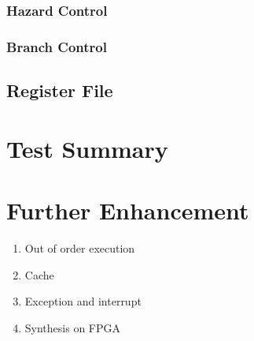 \documentclass[paper=a4, fontsize=11pt]{scrartcl} %
\numberwithin{equation}{section} %
\numberwithin{figure}{section} %
\numberwithin{table}{section} %
\begin{document}
\begin{spacing}{1.5}
    	\subsubsection{Hazard Control}
    	\subsubsection{Branch Control}
    \subsection{Register File}
\section{Test Summary}
\section{Further Enhancement}
	\begin{enumerate}
		\item Out of order execution
		\item Cache
		\item Exception and interrupt
		\item Synthesis on FPGA
	\end{enumerate}
\newpage
\nocite{*}


\newpage
\renewcommand{\appendixpagename}{\scshape \Large \mdseries \rmfamily Appendices}
\begin{appendices}
    \renewcommand{\thesection}{\Alph{section}}
    

\end{appendices}
\end{spacing}
\end{document}
